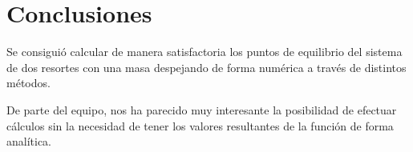 \documentclass[10pt,a4paper]{article}
\begin{document}
\section{Conclusiones}

Se consiguió calcular de manera satisfactoria los puntos de equilibrio del sistema de dos resortes con una masa despejando de forma numérica a través de distintos métodos.

De parte del equipo, nos ha parecido muy interesante la posibilidad de efectuar cálculos sin la necesidad de tener los valores resultantes de la función de forma analítica.





%
%
\end{document}
